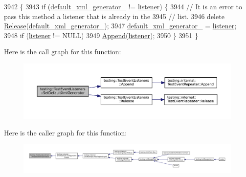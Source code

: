 \begin{DoxyCode}
3942                                                                            \{
3943   \textcolor{keywordflow}{if} (\hyperlink{classtesting_1_1TestEventListeners_a018a3952aa10c19251b88f27abe373d3}{default\_xml\_generator\_} != \hyperlink{namespaceinteractive__marker_a0e579ab555212bb5e2c9f8a675b7618a}{listener}) \{
3944     \textcolor{comment}{// It is an error to pass this method a listener that is already in the}
3945     \textcolor{comment}{// list.}
3946     \textcolor{keyword}{delete} \hyperlink{classtesting_1_1TestEventListeners_a038c9fa1975f84d6f3d25b52bc7bccdd}{Release}(\hyperlink{classtesting_1_1TestEventListeners_a018a3952aa10c19251b88f27abe373d3}{default\_xml\_generator\_});
3947     \hyperlink{classtesting_1_1TestEventListeners_a018a3952aa10c19251b88f27abe373d3}{default\_xml\_generator\_} = \hyperlink{namespaceinteractive__marker_a0e579ab555212bb5e2c9f8a675b7618a}{listener};
3948     \textcolor{keywordflow}{if} (\hyperlink{namespaceinteractive__marker_a0e579ab555212bb5e2c9f8a675b7618a}{listener} != NULL)
3949       \hyperlink{classtesting_1_1TestEventListeners_a1207dce74d64c1c39ffa6105560536a0}{Append}(\hyperlink{namespaceinteractive__marker_a0e579ab555212bb5e2c9f8a675b7618a}{listener});
3950   \}
3951 \}
\end{DoxyCode}
Here is the call graph for this function\+:
\nopagebreak
\begin{figure}[H]
\begin{center}
\leavevmode
\includegraphics[width=350pt]{classtesting_1_1TestEventListeners_a36dbac47563ef8bb78cb467d11f5b4d9_cgraph}
\end{center}
\end{figure}
Here is the caller graph for this function\+:
\nopagebreak
\begin{figure}[H]
\begin{center}
\leavevmode
\includegraphics[width=350pt]{classtesting_1_1TestEventListeners_a36dbac47563ef8bb78cb467d11f5b4d9_icgraph}
\end{center}
\end{figure}
\mbox{\label{classtesting_1_1TestEventListeners_a7132550dc1c50bb3399a6d6d3fc9be3d}} 
